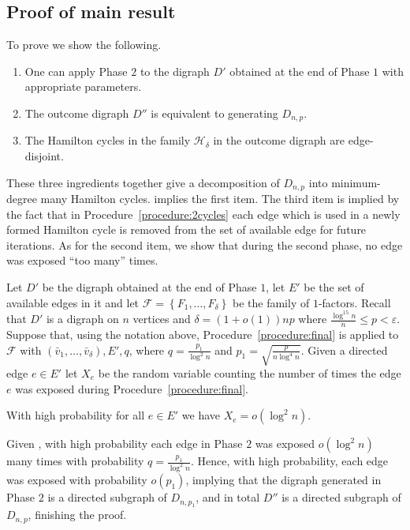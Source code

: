\documentclass{article}
\begin{document}
	\subsection{Proof of main result}
	To prove  we show the following.
	\begin{enumerate}
		\item One can apply Phase $2$ to the digraph $D'$ obtained at the end of Phase $1$ with appropriate parameters.
		\item The outcome digraph $D''$ is equivalent to generating $D_{n,p}$.
		\item The Hamilton cycles in the family $\mathcal H_{\delta}$ in the outcome digraph are edge-disjoint.
	\end{enumerate}
	These three ingredients together give a decomposition of $D_{n,p}$ into minimum-degree many Hamilton cycles.
	 implies the first item.
	The third item is implied by the fact that in Procedure~\ref{procedure:2cycles} each edge which is used in a newly formed Hamilton cycle is removed from the set of available edge for future iterations.
	As for the second item, we show that during the second phase, no edge was exposed ``too many'' times.
	
	Let $D'$ be the digraph obtained at the end of Phase $1$, let $E'$ be the set of available edges in it and let $\mathcal F = \left\{F_1, \ldots, F_{\delta} \right\}$ be the family of $1$-factors.
	Recall that $D'$ is a digraph on $n$ vertices and $\delta = (1+o(1))np$ where $\frac{\log^{15}n}{n} \le p < \varepsilon$.
	Suppose that, using the notation above, Procedure~\ref{procedure:final} is applied to $\mathcal F$ with $\left(\bar{v}_1, \ldots, \bar{v}_{\delta} \right), E', q$, where $q = \frac{p_1}{\log^2 n}$ and $p_1 = \sqrt{\frac{p}{n\log^4 n}}$.
	Given a directed edge $e \in E'$ let $X_e$ be the random variable counting the number of times the edge $e$ was exposed during Procedure~\ref{procedure:final}.
	
	\begin{lemma}
		\label{lem:uvProb}
		With high probability for all $e \in E'$ we have $X_e = o(\log^2 n)$.
	\end{lemma}
	
	Given , with high probability each edge in Phase $2$ was exposed $o(\log^2 n)$ many times with probability $q = \frac{p_1}{\log^2 n}$.
	Hence, with high probability, each edge was exposed with probability $o(p_1)$, implying that the digraph generated in Phase $2$ is a directed subgraph of $D_{n,p_1}$, and in total $D''$ is a directed subgraph of $D_{n,p}$, finishing the proof.
	
\end{document}

